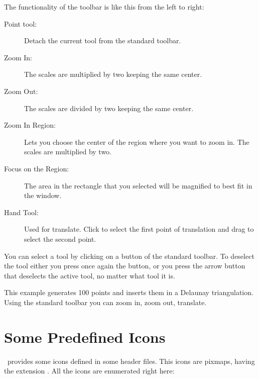 The functionality of the toolbar is like this from the left to right:
\begin{description}
        \item[Point tool:] Detach the current tool from the standard toolbar.

        \item[Zoom In:] The scales are multiplied by two keeping the same center.

        \item[Zoom Out:] The scales are divided by two keeping the same center.

        \item[Zoom In Region:] Lets you choose the center of the region where you want to zoom in. 
           The scales are multiplied by two.

        \item[Focus on the Region:] The area in the rectangle that you selected will be magnified to 
           best fit in the window.

        \item[Hand Tool:] Used for translate. Click to select the first point of translation and 
           drag to select the second point.
\end{description}

You can select a tool by clicking on a button of the standard
toolbar. To deselect the tool either you press once again the
button, or you press the arrow button that deselects the active tool,
no matter what tool it is.

\ccExample
{}

This example generates 100 points and inserts them in a Delaunay
triangulation. Using the standard toolbar you can zoom in, zoom out,
translate.

\section{Some Predefined Icons}
\label{The predefined icons}

\cgal\ provides some icons defined in some header files. This icons are
pixmaps, having the extension . All the icons are enumerated right
here:



